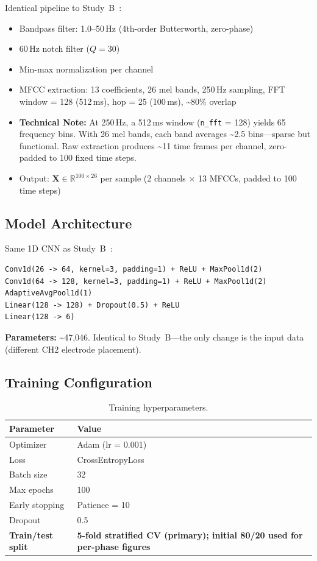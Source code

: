 \documentclass[11pt, a4paper]{article}
\begin{document}
Identical pipeline to Study~B~\cite[{\S}3]{kho2026companion}:
\begin{itemize}
    \item Bandpass filter: 1.0--50\,Hz (4th-order Butterworth, zero-phase)
    \item 60\,Hz notch filter ($Q = 30$)
    \item Min-max normalization per channel
    \item MFCC extraction: 13 coefficients, 26 mel bands, 250\,Hz sampling, FFT window = 128 (512\,ms), hop = 25 (100\,ms), \textasciitilde80\% overlap
    \item \textbf{Technical Note:} At 250\,Hz, a 512\,ms window (\texttt{n\_fft} = 128) yields 65 frequency bins. With 26 mel bands, each band averages \textasciitilde2.5 bins---sparse but functional. Raw extraction produces \textasciitilde11 time frames per channel, zero-padded to 100 fixed time steps.
    \item Output: $\mathbf{X} \in \mathbb{R}^{100 \times 26}$ per sample (2 channels $\times$ 13 MFCCs, padded to 100 time steps)
\end{itemize}

\subsection{Model Architecture}

Same 1D CNN as Study~B~\cite[{\S}5.1]{kho2026companion}:

\begin{verbatim}
Conv1d(26 -> 64, kernel=3, padding=1) + ReLU + MaxPool1d(2)
Conv1d(64 -> 128, kernel=3, padding=1) + ReLU + MaxPool1d(2)
AdaptiveAvgPool1d(1)
Linear(128 -> 128) + Dropout(0.5) + ReLU
Linear(128 -> 6)
\end{verbatim}

\textbf{Parameters:} \textasciitilde47{,}046. Identical to Study~B---the only change is the input data (different CH2 electrode placement).

\subsection{Training Configuration}

\begin{table}[ht]
\centering
\caption{Training hyperparameters.}
\label{tab:training}
\begin{tabular}{@{}ll@{}}
\toprule
Parameter & Value \\
\midrule
Optimizer & Adam (lr = 0.001) \\
Loss & CrossEntropyLoss \\
Batch size & 32 \\
Max epochs & 100 \\
Early stopping & Patience = 10 \\
Dropout & 0.5 \\
\textbf{Train/test split} & \textbf{5-fold stratified CV (primary); initial 80/20 used for per-phase figures} \\
\bottomrule
\end{tabular}
\end{table}
\end{document}
